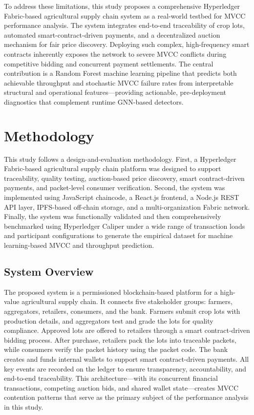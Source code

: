 \documentclass[manuscript,screen,nofonts]{acmart}
\begin{document}
To address these limitations, this study proposes a comprehensive Hyperledger Fabric-based agricultural supply chain system as a real-world testbed for MVCC performance analysis. The system integrates end-to-end traceability of crop lots, automated smart-contract-driven payments, and a decentralized auction mechanism for fair price discovery. Deploying such complex, high-frequency smart contracts inherently exposes the network to severe MVCC conflicts during competitive bidding and concurrent payment settlements. The central contribution is a Random Forest machine learning pipeline that predicts both achievable throughput and stochastic MVCC failure rates from interpretable structural and operational features---providing actionable, pre-deployment diagnostics that complement runtime GNN-based detectors.

\section{Methodology}
	
	This study follows a design-and-evaluation methodology. First, a Hyperledger Fabric-based agricultural supply chain platform was designed to support traceability, quality testing, auction-based price discovery, smart contract-driven payments, and packet-level consumer verification. Second, the system was implemented using JavaScript chaincode, a React.js frontend, a Node.js REST API layer, IPFS-based off-chain storage, and a multi-organization Fabric network. Finally, the system was functionally validated and then comprehensively benchmarked using Hyperledger Caliper under a wide range of transaction loads and participant configurations to generate the empirical dataset for machine learning-based MVCC and throughput prediction.
	
\subsection{System Overview}

The proposed system is a permissioned blockchain-based platform for a high-value agricultural supply chain. It connects five stakeholder groups: farmers, aggregators, retailers, consumers, and the bank. Farmers submit crop lots with production details, and aggregators test and grade the lots for quality compliance. Approved lots are offered to retailers through a smart contract-driven bidding process. After purchase, retailers pack the lots into traceable packets, while consumers verify the packet history using the packet code. The bank creates and funds internal wallets to support smart contract-driven payments. All key events are recorded on the ledger to ensure transparency, accountability, and end-to-end traceability. This architecture—with its concurrent financial transactions, competing auction bids, and shared wallet state—creates MVCC contention patterns that serve as the primary subject of the performance analysis in this study.
\end{document}
